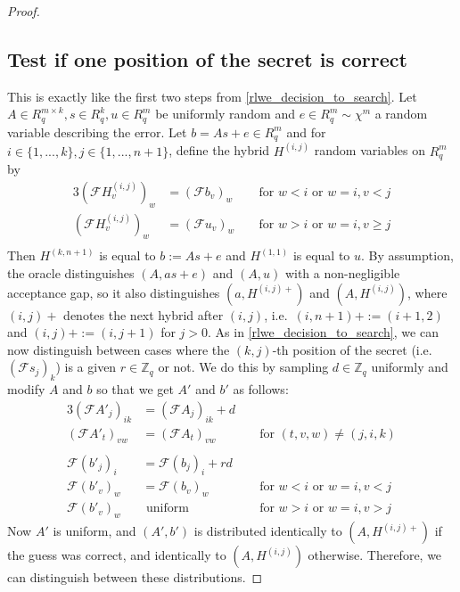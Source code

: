 \documentclass{report}
\newcommand{\Z}{\mathbb{Z}}
\begin{document}
\begin{proof}
\subsection{Test if one position of the secret is correct}
This is exactly like the first two steps from \ref{rlwe_decision_to_search}. Let $A \in R_q^{m \times k}, s \in R_q^k, u \in R_q^m$ be uniformly random and $e \in R_q^m \sim \chi^m$ a random variable describing the error. Let $b = As + e \in R_q^m$ and for $i \in \{ 1, ..., k \}, j \in \{ 1, ..., n + 1 \}$, define the hybrid $H^{(i, j)}$ random variables on $R_q^m$ by
\begin{alignat*}{3}
(\mathcal{F}H^{(i, j)}_v)_w &= (\mathcal{F}b_v)_w &&\text{ for } w < i \text{ or } w = i, v < j \\
(\mathcal{F}H^{(i, j)}_v)_w &= (\mathcal{F}u_v)_w &&\text{ for } w > i \text{ or } w = i, v \geq j\\
\end{alignat*}
Then $H^{(k, n + 1)}$ is equal to $b := As + e$ and $H^{(1, 1)}$ is equal to $u$. By assumption, the oracle distinguishes $(A, as + e)$ and $(A, u)$ with a non-negligible acceptance gap, so it also distinguishes $(a, H^{(i, j)+})$ and $(A, H^{(i, j)})$, where $(i, j)+$ denotes the next hybrid after $(i, j)$, i.e.\ $(i, n + 1)+ := (i + 1, 2)$ and $(i, j)+ := (i, j + 1)$ for $j > 0$. As in \ref{rlwe_decision_to_search}, we can now distinguish between cases where the $(k, j)$-th position of the secret (i.e.\ $(\mathcal{F}s_j)_k$) is a given $r \in \Z_q$ or not. We do this by sampling $d \in \Z_q$ uniformly and modify $A$ and $b$ so that we get $A'$ and $b'$ as follows:
\begin{alignat*}{3}
(\mathcal{F}A'_j)_{ik} &= (\mathcal{F}A_j)_{ik} + d && \\
(\mathcal{F}A'_t)_{vw} &= (\mathcal{F}A_t)_{vw} &&\text{ for } (t, v, w) \neq (j, i, k) \\
\\
\mathcal{F}(b'_j)_i & = \mathcal{F}(b_j)_i + rd && \\
\mathcal{F}(b'_v)_w & = \mathcal{F}(b_v)_w && \text{ for } w < i \text{ or } w = i, v < j \\
\mathcal{F}(b'_v)_w &\text{ uniform } && \text{ for } w > i \text{ or } w = i, v > j
\end{alignat*}
Now $A'$ is uniform, and $(A', b')$ is distributed identically to $(A, H^{(i, j)+})$ if the guess was correct, and identically to $(A, H^{(i, j)})$ otherwise. Therefore, we can distinguish between these distributions.


\end{proof}
\end{document}
